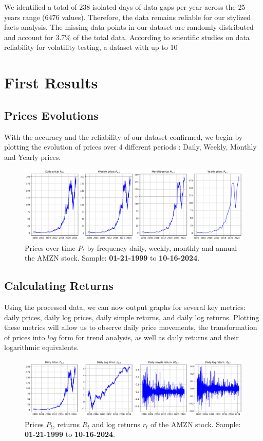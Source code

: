 \documentclass{article}
\begin{document}
\noindent We identified a total of 238 isolated days of data gaps per year across the 25-years range (6476 values). 
Therefore, the data remains reliable for our stylized facts analysis. 
The missing data points in our dataset are randomly distributed and account for 3.7\% of the total data. 
According to scientific studies on data reliability for volatility testing, a dataset with up to 10%
\cite{pumi2023longrange} 

\section{First Results}

\subsection{Prices Evolutions}

With the accuracy and the reliability of our dataset confirmed, we begin by plotting the evolution of prices over 4 different periods : Daily, Weekly, Monthly and Yearly prices.

\begin{figure}[H]
    \centering
    \includegraphics[width=\textwidth]{Img/prices_time.pdf}
    \caption{Prices over time $P_t$  by frequency daily, weekly, monthly and annual the AMZN stock.
    Sample: \textbf{01-21-1999} to \textbf{10-16-2024}.}
    \label{fig:prices_time}
\end{figure}

\subsection{Calculating Returns}
Using the processed data, we can now output graphs for several key metrics: 
daily prices, daily log prices, daily simple returns, and daily log returns. 
Plotting these metrics will allow us to observe daily price movements, 
the transformation of prices into $log$ form for trend analysis, 
as well as daily returns and their logarithmic equivalents.
\begin{figure}[H]
    \centering
    \includegraphics[width=\textwidth]{Img/log_returns.pdf}
    \caption{Prices $P_t$, returns $R_t$ and log returns $r_t$ of the AMZN stock.
    Sample: \textbf{01-21-1999} to \textbf{10-16-2024}.}
    \label{fig:log_returns}
\end{figure}
\end{document}
